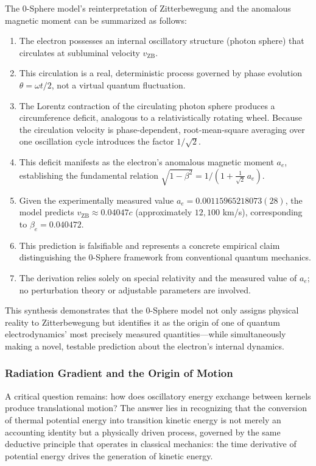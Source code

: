 \documentclass[12pt,letterpaper]{article}
\begin{document}
The 0-Sphere model's reinterpretation of Zitterbewegung and the anomalous magnetic moment can be summarized as follows:
\begin{enumerate}
\item The electron possesses an internal oscillatory structure (photon sphere) that circulates at subluminal velocity $v_{\mathrm{ZB}}$.
\item This circulation is a real, deterministic process governed by phase evolution $\theta = \omega t/2$, not a virtual quantum fluctuation.
\item The Lorentz contraction of the circulating photon sphere produces a circumference deficit, analogous to a relativistically rotating wheel. Because the circulation velocity is phase-dependent, root-mean-square averaging over one oscillation cycle introduces the factor $1/\sqrt{2}$.
\item This deficit manifests as the electron's anomalous magnetic moment $a_e$, establishing the fundamental relation $\sqrt{1 - \beta^2} = 1/\!\left(1 + \frac{1}{\sqrt{2}}\,a_e\right)$.
\item Given the experimentally measured value $a_e = 0.00115965218073(28)$, the model predicts $v_{\mathrm{ZB}} \approx 0.04047c$ (approximately $12{,}100$ km/s), corresponding to $\beta_e = 0.040472$.
\item This prediction is falsifiable and represents a concrete empirical claim distinguishing the 0-Sphere framework from conventional quantum mechanics.
\item The derivation relies solely on special relativity and the measured value of $a_e$; no perturbation theory or adjustable parameters are involved.
\end{enumerate}

This synthesis demonstrates that the 0-Sphere model not only assigns physical reality to Zitterbewegung but identifies it as the origin of one of quantum electrodynamics' most precisely measured quantities---while simultaneously making a novel, testable prediction about the electron's internal dynamics.

\subsubsection{Radiation Gradient and the Origin of Motion}
\label{subsubsec:radiation_gradient}

A critical question remains: how does oscillatory energy exchange between kernels produce translational motion? The answer lies in recognizing that the conversion of thermal potential energy into transition kinetic energy is not merely an accounting identity but a physically driven process, governed by the same deductive principle that operates in classical mechanics: the time derivative of potential energy drives the generation of kinetic energy.
\end{document}
